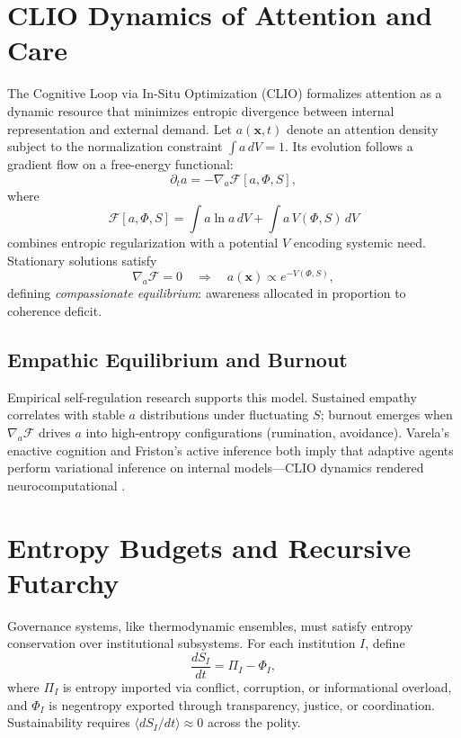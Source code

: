 \documentclass[12pt,a4paper]{article}
\begin{document}
\section{CLIO Dynamics of Attention and Care}
The Cognitive Loop via In-Situ Optimization (CLIO) formalizes attention as a dynamic resource that minimizes entropic divergence between internal representation and external demand. Let $a(\mathbf{x},t)$ denote an attention density subject to the normalization constraint $\int a \, dV = 1$. Its evolution follows a gradient flow on a free-energy functional:
\begin{equation}
\partial_t a = -\nabla_a \mathcal{F}[a,\Phi,S],
\label{eq:clio-flow}
\end{equation}
where
\begin{equation}
\mathcal{F}[a,\Phi,S] = \int a \ln a \, dV + \int a \, V(\Phi,S) \, dV
\label{eq:free-energy}
\end{equation}
combines entropic regularization with a potential $V$ encoding systemic need. Stationary solutions satisfy
\begin{equation}
\nabla_a \mathcal{F} = 0 \quad \Rightarrow \quad a(\mathbf{x}) \propto e^{-V(\Phi,S)},
\label{eq:compassionate-eq}
\end{equation}
defining \emph{compassionate equilibrium}: awareness allocated in proportion to coherence deficit.

\subsection{Empathic Equilibrium and Burnout}
Empirical self-regulation research supports this model. Sustained empathy correlates with stable $a$ distributions under fluctuating $S$; burnout emerges when $\nabla_a \mathcal{F}$ drives $a$ into high-entropy configurations (rumination, avoidance). Varela’s enactive cognition and Friston’s active inference both imply that adaptive agents perform variational inference on internal models—CLIO dynamics rendered neurocomputational \cite{varela1991embodied,friston2010free}.

\section{Entropy Budgets and Recursive Futarchy}
Governance systems, like thermodynamic ensembles, must satisfy entropy conservation over institutional subsystems. For each institution $I$, define
\begin{equation}
\frac{dS_I}{dt} = \Pi_I - \Phi_I,
\label{eq:entropy-budget}
\end{equation}
where $\Pi_I$ is entropy imported via conflict, corruption, or informational overload, and $\Phi_I$ is negentropy exported through transparency, justice, or coordination. Sustainability requires $\langle dS_I/dt \rangle \approx 0$ across the polity.
\end{document}
